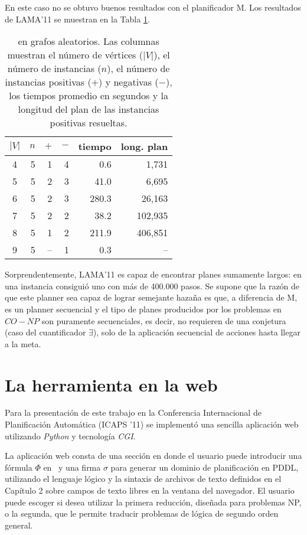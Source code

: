 En este caso no se obtuvo buenos resultados con el planificador M.
Los resultados de LAMA'11 \cite{richter:lama} se muestran en la
Tabla \ref{table:exp:co-3col}.

\begin{table}[h!]
\centering
\begin{tabular}{crrrrr}
$|V|$ & $n$ & $+$ & $-$ &  tiempo & long. plan  \\
\midrule
    4 &   5 &   1 &   4 &   0.6 &   1,731  \\
    5 &   5 &   2 &   3 &  41.0 &   6,695  \\
    6 &   5 &   2 &   3 & 280.3 &  26,163  \\
    7 &   5 &   2 &   2 &  38.2 & 102,935  \\
    8 &   5 &   1 &   2 & 211.9 & 406,851  \\
    9 &   5 & -- &   1 &   0.3 &      -- \\
\end{tabular}
\caption[Resultados de LAMA'11 para \coCOL]{\small \coCOL en grafos aleatorios.
  Las columnas muestran el número de vértices ($|V|$), el número de instancias ($n$),
  el número de instancias positivas ($+$) y negativas ($-$), los tiempos
  promedio en segundos y la longitud del plan de las instancias positivas
  resueltas.
}
\label{table:exp:co-3col}
\end{table}

Sorprendentemente, LAMA'11 es capaz de encontrar planes sumamente largos: en
una instancia consiguió uno con más de 400.000 pasos. Se supone que la razón
de que este planner sea capaz de lograr semejante hazaña es que, a diferencia de M, es
un planner secuencial y el tipo de planes producidos por los problemas en $CO-NP$ son puramente secuenciales, es decir, no requieren
de una conjetura (caso del cuantificador $\exists$), solo de la aplicación secuencial de acciones hasta llegar a la meta.

\section{La herramienta en la web}

Para la presentación de este trabajo en la Conferencia Internacional de
Planificación Automática (ICAPS '11) se implementó una sencilla aplicación web
utilizando \textit{Python} y tecnología \textit{CGI}.


La aplicación web consta de una sección en donde el usuario puede introducir
una fórmula $\Phi$ en \LSO\ y una firma $\sigma$ para generar un dominio de
planificación en PDDL, utilizando el lenguaje lógico y la
sintaxis de archivos de texto definidos en el Capítulo 2 sobre campos de texto
libres en la ventana del navegador.
El usuario puede escoger si desea utilizar la primera reducción, diseñada para
problemas NP, o la segunda, que le permite traducir problemas de lógica de
segundo orden general.


